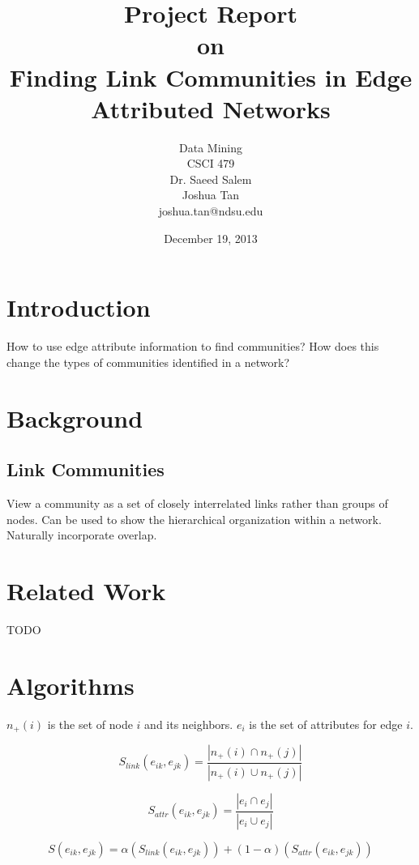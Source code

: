 \documentclass{report}
\title{Project Report\\[0.5em]{\Large on}\\[0.5em]Finding Link Communities in Edge Attributed Networks}
\author{Data Mining\\CSCI 479\\Dr. Saeed Salem\\[1em] Joshua Tan\\joshua.tan@ndsu.edu}
\date{December 19, 2013}
\begin{document}
\maketitle

\section*{Introduction}

How to use edge attribute information to find communities? How does this change the types of communities identified in a network?

\section*{Background}

\subsection*{Link Communities}

View a community as a set of closely interrelated links rather than groups of nodes. Can be used to show the hierarchical organization within a network. Naturally incorporate overlap.

\section*{Related Work}

TODO

\section*{Algorithms}

$n_+(i)$ is the set of node $i$ and its neighbors. $e_i$ is the set of  attributes for edge $i$.

\begin{equation}
  S_{link}(e_{ik},e_{jk}) = \frac{|n_+(i) \cap n_+(j)|}{|n_+(i) \cup n_+(j)|}
\end{equation}

\begin{equation}
  S_{attr}(e_{ik},e_{jk}) = \frac{|e_i \cap e_j|}{|e_i \cup e_j|}
\end{equation}

\begin{equation}
  S(e_{ik},e_{jk}) = \alpha (S_{link}(e_{ik},e_{jk})) + (1-\alpha)(S_{attr}(e_{ik},e_{jk}))
\end{equation}
\end{document}
